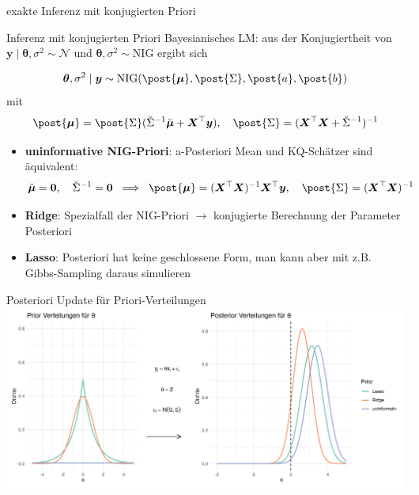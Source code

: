 \documentclass[
  ignorenonframetext,
  aspectratio=169,
]{beamer}
\providecommand{\tightlist}{%
  \setlength{\itemsep}{0pt}\setlength{\parskip}{0pt}}
\newcommand{\bnull}{\bm{0}}
\newcommand{\by}{\bm{y}}
\newcommand{\bX}{\bm{X}}
\newcommand{\Ncal}{\mathcal{N}}
\newcommand{\ssd}{\sigma^2}
\newcommand{\btheta}{\bm{\theta}}
\newcommand{\mupri}{\breve{\bm{\mu}}}
\newcommand{\mupo}{\post{\bm{\mu}}}
\newcommand{\Sdpo}{\post{\Sigma}}
\newcommand{\Sdipri}{\breve{\Sigma}^{-1}}
\newcommand{\apo}{\post{a}}
\newcommand{\bpo}{\post{b}}
\begin{document}
\begin{frame}{exakte Inferenz mit konjugierten Priori}
\protect{}\label{exakte-inferenz-mit-konjugierten-priori}
\begin{block}{Inferenz mit konjugierten Priori}
\protect{}\label{inferenz-mit-konjugierten-priori}
Bayesianisches LM: aus der Konjugiertheit von
\(\by \mid \btheta, \ssd \sim \Ncal\) und
\(\btheta, \ssd \sim \text{NIG}\) ergibt sich

\[
\btheta, \ssd \mid \by \sim \text{NIG}(\mupo, \Sdpo, \apo, \bpo)
\] mit \[
\mupo = \Sdpo (\Sdipri \mupri + \bX^\top \by), \quad \Sdpo = (\bX^\top \bX + \Sdipri)^{-1}
\]
\end{block}

\begin{itemize}
\tightlist
\item
  \textbf{uninformative NIG-Priori}: a-Posteriori Mean und KQ-Schätzer
  sind äquivalent: \[
  \mupri = \bnull, \quad \Sdipri = \bnull \; \implies \; \mupo = (\bX^\top \bX)^{-1} \bX^\top \by,\quad \Sdpo = (\bX^\top \bX)^{-1}
  \]
\end{itemize}

\begin{itemize}
\tightlist
\item
  \textbf{Ridge}: Spezialfall der NIG-Priori \(\to\) konjugierte
  Berechnung der Parameter Posteriori
\item
  \textbf{Lasso}: Posteriori hat keine geschlossene Form, man kann aber
  mit z.B. Gibbs-Sampling daraus simulieren
  \autocite{park_bayesian_2008}
\end{itemize}
\end{frame}

\begin{frame}{Posteriori Update für Priori-Verteilungen}
\protect{}\label{posteriori-update-fuxfcr-priori-verteilungen}
\includegraphics[width=0.9\linewidth,height=\textheight,keepaspectratio]{../figures/plot_update.png}
\end{frame}
\end{document}
